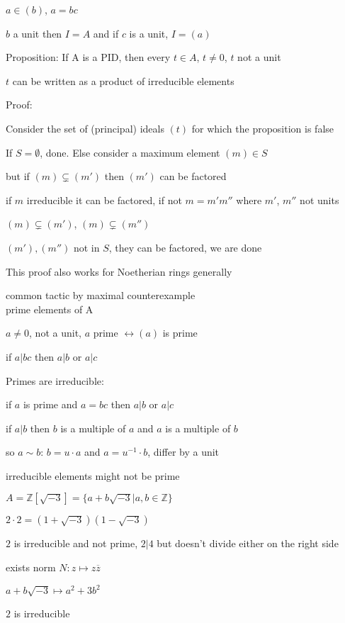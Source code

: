 \documentclass[12pt]{article}
\begin{document}
$a \in (b)$, $a = bc$

$b$ a unit then $I = A$ and if $c$ is a unit, $I = (a)$

\noindent
Proposition: If A is a PID, then every $t \in A$, $t \neq 0$, $t$ not a unit

$t$ can be written as a product of irreducible elements

\noindent
Proof:

Consider the set of (principal) ideals $(t)$ for which the proposition is false

If $S = \emptyset$, done.  Else consider a maximum element $(m) \in S$

but if $(m) \subsetneq (m')$ then $(m')$ can be factored

if $m$ irreducible it can be factored, if not $m = m'm''$ where $m'$, $m''$ not units

$(m) \subsetneq (m')$, $(m) \subsetneq (m'')$

$(m'), (m'')$ not in $S$, they can be factored, we are done

\noindent
This proof also works for Noetherian rings generally

\noindent
common tactic by maximal counterexample\\

\noindent
prime elements of A

$a \neq 0$, not a unit, $a$ prime $\leftrightarrow (a)$ is prime

if $a | bc$ then $a | b$ or $a | c$

\noindent
Primes are irreducible:

if $a$ is prime and $a = bc$ then $a|b$ or $a|c$

if $a|b$ then $b$ is a multiple of $a$ and $a$ is a multiple of $b$

so $a \sim b$: $b = u \cdot a$ and $a = u^{-1} \cdot b$, differ by a unit

\noindent
irreducible elements might not be prime

$A = \mathds{Z}[\sqrt{-3}] = \{a + b\sqrt{-3} | a, b \in \mathds{Z}\}$

$2 \cdot 2 = (1 + \sqrt{-3})(1 - \sqrt{-3})$

$2$ is irreducible and not prime, $2 | 4$ but doesn't divide either on the right side

exists norm $N: z \mapsto z\overline{z}$

$a + b\sqrt{-3} \mapsto a^2 + 3b^2$

$2$ is irreducible
\end{document}
